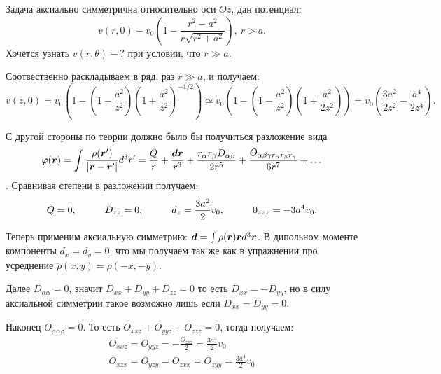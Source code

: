 

Задача аксиально симметрична относительно оси $Oz$, дан потенциал:
\begin{equation*}
    v(r,0) - v_0 \left(1 - \frac{r^2 - a^2}{r \sqrt{r^2 + a^2}}\right), \ r>a.
\end{equation*}
Хочется узнать $v(r,\theta) - ?$ при условии, что $r \gg a$.

Соотвественно раскладываем в ряд, раз $r \gg a$, и получаем:
\begin{equation*}
    v(z,0) = v_0 \left(1 - \left(1 - \frac{a^2}{z^2}\right)\left(1 + \frac{a^2}{z^2}\right)^{-1/2}\right) 
    \simeq
    v_0 \left(1 - \left(1 - \frac{a^2}{z^2}\right)\left(1 + \frac{a^2}{2z^2}\right)\right) 
    =
    v_0 \left(\frac{3 a^2}{2 z^2} - \frac{a^4}{2 z^4}\right).
\end{equation*}

С другой стороны по теории должно было бы получиться разложение вида
\begin{equation*}
    \varphi(\mbox{\boldmath $r$}) = \int \frac{\rho (\mbox{\boldmath $r$}')}{|\mbox{\boldmath $r$} - \mbox{\boldmath $r$}'|}d^3 r'
    = \frac{Q}{r} + \frac{\mbox{\boldmath $d$} \mbox{\boldmath $r$}}{r^3} + \frac{r_\alpha r_\beta D_{\alpha\beta}}{2 r^5} + \frac{O_{\alpha\beta\gamma r_\alpha r_\beta r_\gamma}}{6 r^7} + \ldots
\end{equation*}
. Сравнивая степени в разложении получаем:
\begin{equation*}
    Q = 0, \hspace{1 cm} D_{z z} = 0, \hspace{1 cm} d_z = \frac{3 a^2}{2}v_0,
    \hspace{1 cm} 0_{z z z} = - 3 a^4 v_0.
\end{equation*}

Теперь применим аксиальную симметрию: $\mbox{\boldmath $d$} = \int \rho(\mbox{\boldmath $r$}) \mbox{\boldmath $r$} d^3 \mbox{\boldmath $r$}$. В дипольном моменте компоненты $d_x = d_y = 0$, что мы получаем так же как в упражнении про усреднение $\rho(x, y) = \rho(-x,-y)$.

Далее $D_{\alpha\alpha} = 0$, значит $D_{xx} + D_{yy} + D_{zz} = 0$ то есть $D_{xx} = - D_{yy}$, но в силу аксиальной симметрии такое возможно лишь если $D_{xx} = D_{yy} = 0$.

Наконец $O_{\alpha\alpha\beta} = 0$. То есть $O_{xxz} + O_{yyz} + O_{zzz} = 0$, тогда получаем: 
\begin{gather*}
    O_{xxz} = O_{yyz} = - \frac{O_{zzz}}{2} = \frac{3 a^4}{2}v_0\\
    O_{xzx} = O_{yzy} = O_{zxx} = O_{zyy} = \frac{3 a^4}{2}v_0
\end{gather*}


